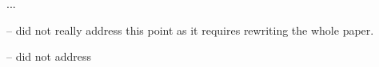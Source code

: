 





...



-- did not really address this point as it requires rewriting the whole 
paper.


-- did not address


